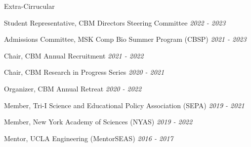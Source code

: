 \documentclass{resume} %
\begin{document}
\begin{rSection}{Extra-Cirrucular} \itemsep -3pt
\item Student Representative, CBM Directors Steering Committee \hfill {\em 2022 - 2023}
\item Admissions Committee, MSK Comp Bio Summer Program (CBSP) \hfill {\em 2021 - 2023}
\item Chair, CBM Annual Recruitment \hfill {\em 2021 - 2022}
\item Chair, CBM Research in Progress Series \hfill {\em 2020 - 2021}
\item Organizer, CBM Annual Retreat \hfill {\em 2020 - 2022}
\item Member, Tri-I Science and Educational Policy Association (SEPA) \hfill {\em 2019 - 2021}
\item Member, New York Academy of Sciences (NYAS) \hfill {\em 2019 - 2022}
\item Mentor, UCLA Engineering (MentorSEAS) \hfill {\em 2016 - 2017}

\end{rSection}

\end{document}
